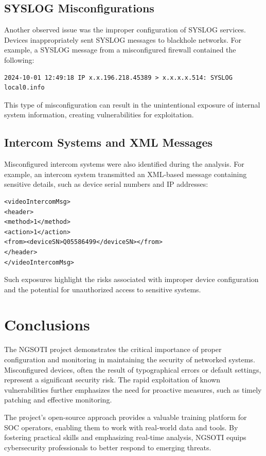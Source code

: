 \documentclass[10pt,a4paper]{report}
\begin{document}
\section{SYSLOG Misconfigurations}
Another observed issue was the improper configuration of SYSLOG services. Devices inappropriately sent SYSLOG messages to blackhole networks. For example, a SYSLOG message from a misconfigured firewall contained the following:
\begin{verbatim}
2024-10-01 12:49:18 IP x.x.196.218.45389 > x.x.x.x.514: SYSLOG local0.info
\end{verbatim}
This type of misconfiguration can result in the unintentional exposure of internal system information, creating vulnerabilities for exploitation.

\section{Intercom Systems and XML Messages}
Misconfigured intercom systems were also identified during the analysis. For example, an intercom system transmitted an XML-based message containing sensitive details, such as device serial numbers and IP addresses:
\begin{verbatim}
<videoIntercomMsg>
<header>
<method>1</method>
<action>1</action>
<from><deviceSN>Q05586499</deviceSN></from>
</header>
</videoIntercomMsg>
\end{verbatim}
Such exposures highlight the risks associated with improper device configuration and the potential for unauthorized access to sensitive systems.

\chapter{Conclusions}
The NGSOTI project demonstrates the critical importance of proper configuration and monitoring in maintaining the security of networked systems. Misconfigured devices, often the result of typographical errors or default settings, represent a significant security risk. The rapid exploitation of known vulnerabilities further emphasizes the need for proactive measures, such as timely patching and effective monitoring.

The project's open-source approach provides a valuable training platform for SOC operators, enabling them to work with real-world data and tools. By fostering practical skills and emphasizing real-time analysis, NGSOTI equips cybersecurity professionals to better respond to emerging threats.


\end{document}
